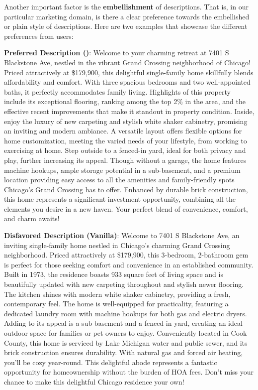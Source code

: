 Another important factor is the \textbf{embellishment} of descriptions. That is, in our particular marketing domain, is there a clear preference towards the embellished or plain style of descriptions. Here are two examples that showcase the different preferences from users: 

\begin{center}\begin{tcolorbox}[colback=white,colframe=gray!20,width=0.95\textwidth]
   {\footnotesize \textbf{Preferred Description (\agentname)}:  Welcome to your charming retreat at 7401 S Blackstone Ave, nestled in the vibrant Grand Crossing neighborhood of Chicago! Priced attractively at \$179,900, this delightful single-family home skillfully blends affordability and comfort. With three spacious bedrooms and two well-appointed baths, it perfectly accommodates family living. Highlights of this property include its exceptional flooring, ranking among the top 2\% in the area, and the effective recent improvements that make it standout in property condition. Inside, enjoy the luxury of new carpeting and stylish white shaker cabinetry, promising an inviting and modern ambiance. A versatile layout offers flexible options for home customization, meeting the varied needs of your lifestyle, from working to exercising at home. Step outside to a fenced-in yard, ideal for both privacy and play, further increasing its appeal. Though without a garage, the home features machine hookups, ample storage potential in a sub-basement, and a premium location providing easy access to all the amenities and family-friendly spots Chicago's Grand Crossing has to offer. Enhanced by durable brick construction, this home represents a significant investment opportunity, combining all the elements you desire in a new haven. Your perfect blend of convenience, comfort, and charm awaits! }
    \vspace{0.2em}

    {\footnotesize \textbf{Disfavored Description (Vanilla)}:  Welcome to 7401 S Blackstone Ave, an inviting single-family home nestled in Chicago's charming Grand Crossing neighborhood. Priced attractively at \$179,900, this 3-bedroom, 2-bathroom gem is perfect for those seeking comfort and convenience in an established community. Built in 1973, the residence boasts 933 square feet of living space and is beautifully updated with new carpeting throughout and stylish newer flooring. The kitchen shines with modern white shaker cabinetry, providing a fresh, contemporary feel. The home is well-equipped for practicality, featuring a dedicated laundry room with machine hookups for both gas and electric dryers. Adding to its appeal is a sub basement and a fenced-in yard, creating an ideal outdoor space for families or pet owners to enjoy. Conveniently located in Cook County, this home is serviced by Lake Michigan water and public sewer, and its brick construction ensures durability. With natural gas and forced air heating, you’ll be cozy year-round. This delightful abode represents a fantastic opportunity for homeownership without the burden of HOA fees. Don't miss your chance to make this delightful Chicago residence your own! }
    \vspace{0.2em}


\end{tcolorbox}
\end{center}
